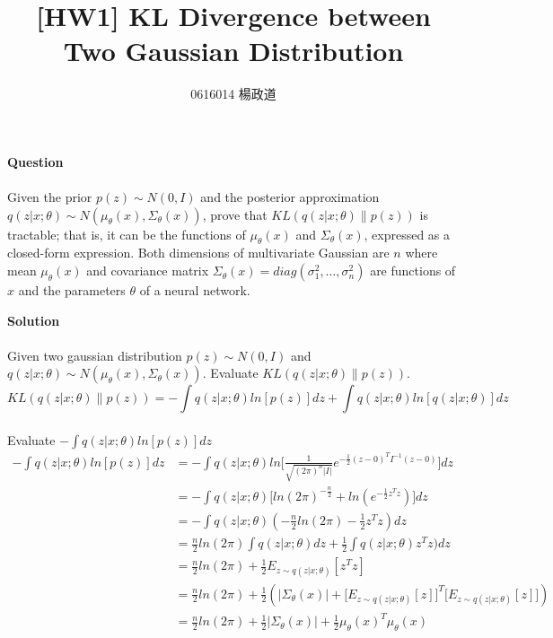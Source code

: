 \title{[HW1] KL Divergence between Two Gaussian Distribution}
\author{0616014 楊政道}
\maketitle
\thispagestyle{fancy}

\textbf{\Large{Question}}
\paragraph{}
Given the prior $p(z)\sim N(0, I)$ and the posterior approximation $q(z|x;\theta)\sim N(\mu_\theta(x), \Sigma_\theta(x))$, prove that $KL(q(z|x;\theta)\|p(z))$ is tractable; that is, it can be the functions of $\mu_\theta(x)$ and $\Sigma_\theta(x)$, expressed as a closed-form expression. Both dimensions of multivariate Gaussian are $n$ where mean $\mu_\theta(x)$ and covariance matrix $\Sigma_\theta(x)=diag(\sigma_1^2, \dots, \sigma_n^2)$ are functions of $x$ and the parameters $\theta$ of a neural network.
\vspace{1cm}

\textbf{\Large{Solution}}
\paragraph{}
Given two gaussian distribution $p(z)\sim N(0, I)$ and $q(z|x;\theta)\sim N(\mu_\theta(x), \Sigma_\theta(x))$. Evaluate $KL(q(z|x;\theta)\|p(z))$.
$$KL(q(z|x;\theta)\|p(z)) = -\int q(z|x;\theta)ln[p(z)]dz + \int q(z|x;\theta)ln[q(z|x;\theta)]dz$$
\paragraph{}
Evaluate $-\int q(z|x;\theta)ln[p(z)]dz$
\begin{equation}
\begin{aligned}
-\int q(z|x;\theta)ln[p(z)]dz 
&= -\int q(z|x;\theta)ln\biggl[\frac{1}{\sqrt{(2\pi)^n|I|}}e^{-\frac{1}{2}(z-0)^TI^{-1}(z-0)}\biggr]dz \\
&= -\int q(z|x;\theta)\biggl[ln(2\pi)^{-\frac{n}{2}}+ln(e^{-\frac{1}{2}z^Tz})\biggr]dz \\
&= -\int q(z|x;\theta)(-\frac{n}{2}ln(2\pi)-\frac{1}{2}z^Tz)dz \\
&= \frac{n}{2}ln(2\pi)\int q(z|x;\theta)dz + \frac{1}{2}\int q(z|x;\theta)z^Tz)dz \\
&= \frac{n}{2}ln(2\pi) + \frac{1}{2}E_{z\sim q(z|x;\theta)}[z^Tz] \\
&= \frac{n}{2}ln(2\pi) + \frac{1}{2}(|\Sigma_\theta(x)|+\biggl[E_{z\sim q(z|x;\theta)}[z]\biggr]^T\biggl[E_{z\sim q(z|x;\theta)}[z]\biggr]) \\
&= \frac{n}{2}ln(2\pi) + \frac{1}{2}|\Sigma_\theta(x)|+\frac{1}{2}\mu_\theta(x)^T\mu_\theta(x) \\
\end{aligned}
\end{equation}
